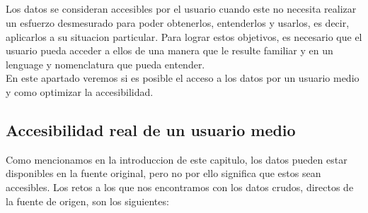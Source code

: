 \subsection*{}
Los datos se consideran accesibles por el usuario cuando este no necesita realizar un esfuerzo desmesurado para
poder obtenerlos, entenderlos y usarlos, es decir, aplicarlos a su situacion particular. Para lograr estos objetivos,
es necesario que el usuario pueda acceder a ellos de una manera que le resulte familiar y en un lenguage y nomenclatura
que pueda entender.\\ 

En este apartado veremos si es posible el acceso a los datos por un usuario medio y como optimizar la accesibilidad.
\subsection{Accesibilidad real de un usuario medio}
    
Como mencionamos en la introduccion de este capitulo, los datos pueden estar disponibles en la fuente original, pero no por
ello significa que estos sean accesibles.
Los retos a los que nos encontramos con los datos crudos, directos de la fuente de origen, son los siguientes:
    

